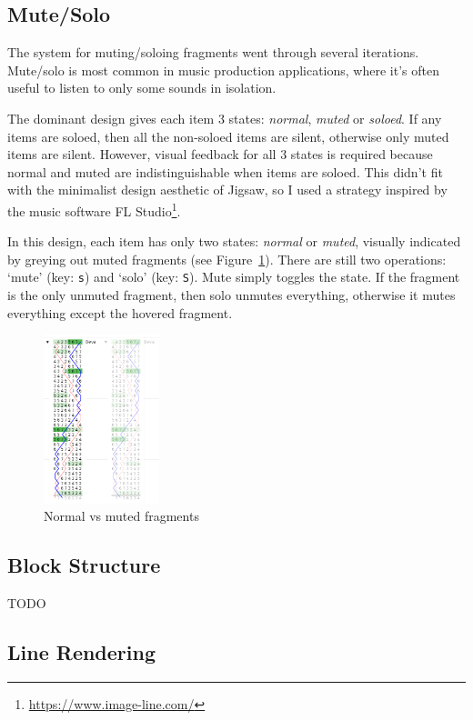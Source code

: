 \documentclass[12pt]{article}
\newcommand{\footurl}[1]{\footnote{\url{#1}}}
\begin{document}
\subsection{Mute/Solo}

The system for muting/soloing fragments went through several iterations.  Mute/solo is most common
in music production applications, where it's often useful to listen to only some sounds in
isolation.

The dominant design gives each item 3 states: \emph{normal}, \emph{muted} or \emph{soloed}.  If any
items are soloed, then all the non-soloed items are silent, otherwise only muted items are silent.
However, visual feedback for all 3 states is required because normal and muted are indistinguishable
when items are soloed.  This didn't fit with the minimalist design aesthetic of Jigsaw, so I used a
strategy inspired by the music software FL Studio\footurl{https://www.image-line.com/}.

In this design, each item has only two states: \emph{normal} or \emph{muted}, visually indicated by
greying out muted fragments (see Figure~\ref{fig:frag-mute}).  There are still two operations:
`mute' (key: \verb|s|) and `solo' (key: \verb|S|).  Mute simply toggles the state.  If the fragment
is the only unmuted fragment, then solo unmutes everything, otherwise it mutes everything except the
hovered fragment.

\begin{figure}
    \centering
    \includegraphics[width=0.3\textwidth]{muted-frag}
    \caption{Normal vs muted fragments}\label{fig:frag-mute}
\end{figure}


\subsection{Block Structure}

TODO

\subsection{Line Rendering}\label{sec:line-rendering}
\end{document}
